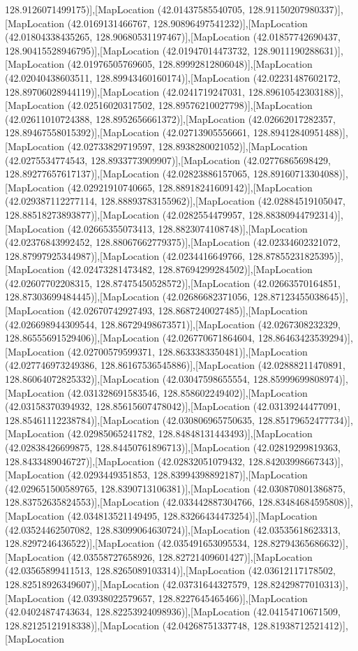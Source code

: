 128.9126071499175)],[MapLocation (42.01437585540705, 128.91150207980337)],[MapLocation (42.0169131466767, 128.90896497541232)],[MapLocation (42.01804338435265, 128.90680531197467)],[MapLocation (42.01857742690437, 128.90415528946795)],[MapLocation (42.01947014473732, 128.9011190288631)],[MapLocation (42.01976505769605, 128.89992812806048)],[MapLocation (42.02040438603511, 128.89943460160174)],[MapLocation (42.02231487602172, 128.89706028944119)],[MapLocation (42.0241719247031, 128.89610542303188)],[MapLocation (42.02516020317502, 128.89576210027798)],[MapLocation (42.02611010724388, 128.8952656661372)],[MapLocation (42.02662017282357, 128.89467558015392)],[MapLocation (42.02713905556661, 128.89412840951488)],[MapLocation (42.02733829719597, 128.8938280021052)],[MapLocation (42.0275534774543, 128.8933773909907)],[MapLocation (42.02776865698429, 128.89277657617137)],[MapLocation (42.02823886157065, 128.89160713304088)],[MapLocation (42.02921910740665, 128.88918241609142)],[MapLocation (42.029387112277114, 128.88893783155962)],[MapLocation (42.02884519105047, 128.88518273893877)],[MapLocation (42.0282554479957, 128.88380944792314)],[MapLocation (42.02665355073413, 128.8823074108748)],[MapLocation (42.02376843992452, 128.88067662779375)],[MapLocation (42.02334602321072, 128.87997925344987)],[MapLocation (42.0234416649766, 128.87855231825395)],[MapLocation (42.02473281473482, 128.87694299284502)],[MapLocation (42.02607702208315, 128.87475450528572)],[MapLocation (42.02663570164851, 128.87303699484445)],[MapLocation (42.02686682371056, 128.87123455038645)],[MapLocation (42.02670742927493, 128.8687240027485)],[MapLocation (42.026698944309544, 128.86729498673571)],[MapLocation (42.0267308232329, 128.86555691529406)],[MapLocation (42.026770671864604, 128.86463423539294)],[MapLocation (42.02700579599371, 128.8633383350481)],[MapLocation (42.027746973249386, 128.86167536545886)],[MapLocation (42.02888211470891, 128.86064072825332)],[MapLocation (42.03047598655554, 128.85999699808974)],[MapLocation (42.031328691583546, 128.858602249402)],[MapLocation (42.03158370394932, 128.85615607478042)],[MapLocation (42.03139244477091, 128.85461112238784)],[MapLocation (42.030806965750635, 128.85179652477734)],[MapLocation (42.02985065241782, 128.84848131443493)],[MapLocation (42.02838426699875, 128.84450761896713)],[MapLocation (42.02819299819363, 128.8433489046727)],[MapLocation (42.02832051079432, 128.84203998667343)],[MapLocation (42.0293449351853, 128.83994398892187)],[MapLocation (42.029651500589765, 128.8390713106381)],[MapLocation (42.030870801386875, 128.83752635824553)],[MapLocation (42.033442887304766, 128.83484684595808)],[MapLocation (42.034813521149495, 128.83266434473254)],[MapLocation (42.03524462507082, 128.83099064630724)],[MapLocation (42.03535618623313, 128.8297246436522)],[MapLocation (42.035491653095534, 128.82794365686632)],[MapLocation (42.03558727658926, 128.82721409601427)],[MapLocation (42.03565899411513, 128.8265089103314)],[MapLocation (42.03612117178502, 128.82518926349607)],[MapLocation (42.03731644327579, 128.82429877010313)],[MapLocation (42.03938022579657, 128.8227645465466)],[MapLocation (42.04024874743634, 128.82253924098936)],[MapLocation (42.04154710671509, 128.82125121918338)],[MapLocation (42.04268751337748, 128.81938712521412)],[MapLocation 